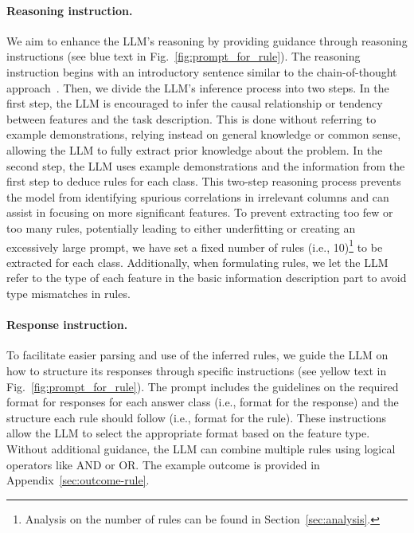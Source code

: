 \documentclass{article}
\theoremstyle{plain}
\theoremstyle{definition}
\theoremstyle{remark}
\newcommand{\cutparagraphup}{\vspace*{-0.12in}}
\begin{document}
\cutparagraphup
\paragraph{Reasoning instruction.} We aim to enhance the LLM's reasoning by providing guidance through reasoning instructions (see blue text in Fig.~\ref{fig:prompt_for_rule}). The reasoning instruction begins with an introductory sentence similar to the chain-of-thought approach~\cite{wei2022chain}.
Then, we divide the LLM's inference process into two steps. In the first step, the LLM is encouraged to infer the causal relationship or tendency between features and the task description. 
This is done without referring to example demonstrations, relying instead on general knowledge or common sense, allowing the LLM to fully extract prior knowledge about the problem. 
In the second step, the LLM uses example demonstrations and the information from the first step to deduce rules for each class. This two-step reasoning process prevents the model from identifying spurious correlations in irrelevant columns and can assist in focusing on more significant features. To prevent extracting too few or too many rules, potentially leading to either underfitting or creating an excessively large prompt, we have set a fixed number of rules (i.e., 10)\footnote{Analysis on the number of rules can be found in Section~\ref{sec:analysis}.} to be extracted for each class. Additionally, when formulating rules, we let the LLM refer to the type of each feature in the basic information description part to avoid type mismatches in rules. 


\cutparagraphup
\paragraph{Response instruction.} To facilitate easier parsing and use of the inferred rules, we guide the LLM on how to structure its responses through specific instructions (see yellow text in Fig.~\ref{fig:prompt_for_rule}). The prompt includes the guidelines on the required format for responses for each answer class (i.e., format for the response) and the structure each rule should follow (i.e., format for the rule). 
These instructions allow the LLM to select the appropriate format based on the feature type. Without additional guidance, the LLM can combine multiple rules using logical operators like AND or OR. The example outcome is provided in Appendix~\ref{sec:outcome-rule}. 
\end{document}
